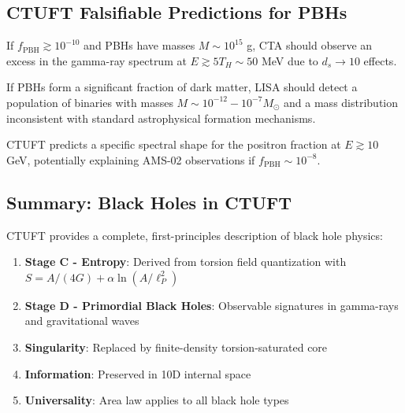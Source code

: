 \subsection{CTUFT Falsifiable Predictions for PBHs}

\begin{prediction}
If $f_{\text{PBH}} \gtrsim 10^{-10}$ and PBHs have masses $M \sim 10^{15}$ g, CTA should observe an excess in the gamma-ray spectrum at $E \gtrsim 5 T_H \sim 50$ MeV due to $d_s \to 10$ effects.
\end{prediction}

\begin{prediction}
If PBHs form a significant fraction of dark matter, LISA should detect a population of binaries with masses $M \sim 10^{-12} - 10^{-7} M_\odot$ and a mass distribution inconsistent with standard astrophysical formation mechanisms.
\end{prediction}

\begin{prediction}
CTUFT predicts a specific spectral shape for the positron fraction at $E \gtrsim 10$ GeV, potentially explaining AMS-02 observations if $f_{\text{PBH}} \sim 10^{-8}$.
\end{prediction}

\subsection{Summary: Black Holes in CTUFT}

CTUFT provides a complete, first-principles description of black hole physics:

\begin{enumerate}
    \item \textbf{Stage C - Entropy}: Derived from torsion field quantization with $S = A/(4G) + \alpha\ln(A/\ell_P^2)$
    \item \textbf{Stage D - Primordial Black Holes}: Observable signatures in gamma-rays and gravitational waves
    \item \textbf{Singularity}: Replaced by finite-density torsion-saturated core
    \item \textbf{Information}: Preserved in 10D internal space
    \item \textbf{Universality}: Area law applies to all black hole types
\end{enumerate}

